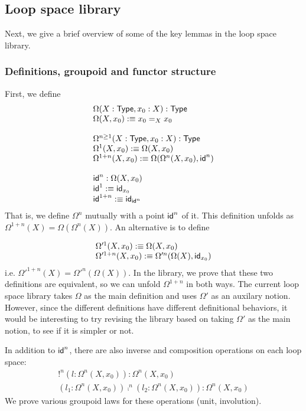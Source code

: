 \subsection{Loop space library}
\label{sec:loopspace}

Next, we give a brief overview of some of the key lemmas in the loop
space library.

\subsubsection{Definitions, groupoid and functor structure}
First, we define
\[
\begin{array}{l}
\Omega(X : \mathsf{Type},x_0 : X) : \mathsf{Type}\\
\Omega(X,x_0) :\equiv x_0 =_X x_0 \\
\\
\Omega^{n \ge 1}(X : \mathsf{Type} , x_0 : X) : \mathsf{Type}\\
\Omega^1(X,x_0) :\equiv \Omega(X,x_0) \\
\Omega^{1+n}(X,x_0) :\equiv \Omega(\Omega^n(X,x_0), \mathsf{id}^n) \\
\\ 
\mathsf{id}^n : \Omega(X,x_0) \\
\mathsf{id}^1 :\equiv \mathsf{id}_{x_0} \\
\mathsf{id}^{1+n} :\equiv \mathsf{id}_{\mathsf{id}^n} \\
\end{array}
\]
That is, we define $\Omega^n$ mutually with a point $\mathsf{id}^n$ of it.   
This definition unfolds as $\Omega^{1+n}(X) = \Omega(\Omega^n(X))$.  An
alternative is to define

\[
\begin{array}{l}
\Omega'^1(X,x_0) :\equiv \Omega(X,x_0) \\
\Omega'^{1+n}(X,x_0) :\equiv \Omega'^n(\Omega(X),\mathsf{id}_{x_0})
\end{array}
\]
i.e. $\Omega'^{1+n}(X) = \Omega'^n(\Omega(X))$.  In the library, we
prove that these two definitions are equivalent, so we can unfold
$\Omega^{1+n}$ in both ways.  The current loop space library takes
$\Omega$ as the main definition and uses $\Omega'$ as an auxilary
notion.  However, since the different definitions have different   
definitional behaviors, it would be interesting to try revising the
library based on taking $\Omega'$ as the main notion, to see if it is
simpler or not.  

In addition to $\mathsf{id}^n$, there are also inverse and composition
operations on each loop space:
\[
\begin{array}{l}
!^n (l : \Omega^n(X,x_0)) : \Omega^n(X,x_0) \\
(l_1 : \Omega^n(X,x_0)) \comp^n (l_2 : \Omega^n(X,x_0)) : \Omega^n(X,x_0)
\end{array}
\]
We prove various groupoid laws for these operations (unit, involution).

